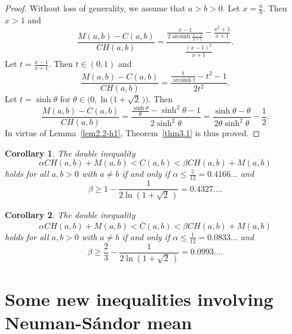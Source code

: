 \documentclass[reqno,a4paper]{amsart}
\numberwithin{equation}{section}
\theoremstyle{plain}
\newtheorem{cor}{Corollary}[section]
\theoremstyle{remark}
\begin{document}
\begin{proof}
Without loss of generality, we assume that $a>b>0$. Let $x=\frac{a}b$. Then $x>1$ and
\begin{equation*}
\frac{M(a,b)-C(a,b)}{CH(a,b)}=\frac{\frac{x-1}{2\operatorname{arcsinh}{\frac{x-1}{x+1}}}
-\frac{x^2+1}{x+1}}{\frac{(x-1)^2}{x+1}}.
\end{equation*}
Let $t=\frac{x-1}{x+1}$. Then $t\in(0,1)$ and
\begin{equation*}
\frac{M(a,b)-C(a,b)}{CH(a,b)}=\frac{\frac{t}{\operatorname{arcsinh} t}
-t^2-1}{2t^2}.
\end{equation*}
Let $t=\sinh\theta$ for $\theta\in\bigl(0,\ln\bigl(1+\sqrt2\,\bigr)\bigr)$. Then
\begin{equation*}
\frac{M(a,b)-C(a,b)}{CH(a,b)}=\frac{\frac{\sinh\theta}{\theta}
-\sinh^2\theta-1}{2\sinh^2\theta}
=\frac{\sinh\theta-\theta}{2\theta\sinh^2\theta}-\frac12.
\end{equation*}
In virtue of Lemma~\ref{lem2.2-h1}, Theorem~\ref{thm3.1} is thus proved.
\end{proof}

\begin{cor}\label{cor3.1}
The double inequality
\begin{equation}\label{cor3.1-eq1}
\alpha CH(a,b)+M(a,b)< C(a,b)<\beta CH(a,b)+M(a,b)
\end{equation}
holds for all $a,b>0$ with $a\ne b$ if and only if
$\alpha\le\frac5{12}=0.4166\dotsc$ and
\begin{equation*}
\beta\ge1-\frac1{2\ln(1+\sqrt2\,)}=0.4327\dotsc.
\end{equation*}
\end{cor}

\begin{cor}
The double inequality
\begin{equation}
\alpha CH(a,b)+M(a,b)< \overline{C}(a,b)<\beta CH(a,b)+M(a,b)
\end{equation}
holds for all $a,b>0$ with $a\ne b$ if and only if $\alpha\le\frac1{12}=0.0833\dotsc$
and
\begin{equation*}
\beta\ge\frac23-\frac1{2\ln(1+\sqrt2\,)}=0.0993\dotsc.
\end{equation*}
\end{cor}

\section{Some new inequalities involving Neuman-S\'andor mean}
\end{document}
